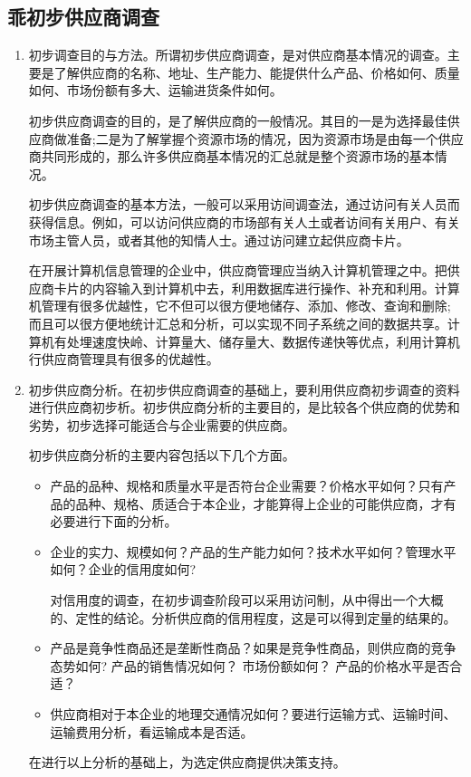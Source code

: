 \subsection {乖初步供应商调查}

    \begin{enumerate}
        \item 初步调查目的与方法。所谓初步供应商调查，是对供应商基本情况的调查。主要是了解供应商的名称、地址、生产能力、能提供什么产品、价格如何、质量如何、市场份额有多大、运输进货条件如何。

        初步供应商调查的目的，是了解供应商的一般情况。其目的一是为选择最佳供应商做准备;二是为了解掌握个资源市场的情况，因为资源市场是由每一个供应商共同形成的，那么许多供应商基本情况的汇总就是整个资源市场的基本情况。

        初步供应商调查的基本方法，一般可以采用访间调查法，通过访问有关人员而获得信息。例如，可以访问供应商的市场部有关人土或者访间有关用户、有关市场主管人员，或者其他的知情人士。通过访问建立起供应商卡片。

        在开展计算机信息管理的企业中，供应商管理应当纳入计算机管理之中。把供应商卡片的内容输入到计算机中去，利用数据库进行操作、补充和利用。计算机管理有很多优越性，它不但可以很方便地储存、添加、修改、查询和删除; 而且可以很方便地统计汇总和分析，可以实现不同子系统之间的数据共享。计算机有处埋速度快岭、计算量大、储存量大、数据传递快等优点，利用计算机行供应商管理具有很多的优越性。

        \item 初步供应商分析。在初步供应商调查的基础上，要利用供应商初步调查的资料进行供应商初步析。初步供应商分析的主要目的，是比较各个供应商的优势和劣势，初步选择可能适合与企业需要的供应商。

        初步供应商分析的主要内容包括以下几个方面。

        \begin{itemize}
            \item  产品的品种、规格和质量水平是否符台企业需要？价格水平如何？只有产品的品种、规格、质适合于本企业，才能算得上企业的可能供应商，才有必要进行下面的分析。

            \item  企业的实力、规模如何？产品的生产能力如何？技术水平如何？管理水平如何？企业的信用度如何?

            对信用度的调查，在初步调查阶段可以采用访问制，从中得出一个大概的、定性的结论。分析供应商的信用程度，这是可以得到定量的结果的。

            \item  产品是竟争性商品还是垄断性商品？如果是竞争性商品，则供应商的竞争态势如何? 产品的销售情况如何？ 市场份额如何？ 产品的价格水平是否合适？

            \item  供应商相对于本企业的地理交通情况如何？要进行运输方式、运输时间、运输费用分析，看运输成本是否适。
        \end{itemize}
        在进行以上分析的基础上，为选定供应商提供决策支持。
    \end{enumerate}

